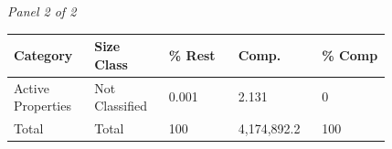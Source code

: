 \documentclass[12pt]{article}
\begin{document}
\begin{landscape}
\begin{table}[H]
\vspace{0.6em}

\textit{Panel 2 of 2}\\[2pt]
{\fontsize{12}{14}\selectfont
\setlength{\tabcolsep}{3pt}
\renewcommand{\arraystretch}{1.08}
\begin{tabular}{p{0.164\linewidth}p{0.164\linewidth}p{0.164\linewidth}p{0.164\linewidth}p{0.164\linewidth}}
\toprule
Category & Size Class & \% Rest & Comp. & \% Comp \\
\midrule
Active Properties & Not Classified & 0.001 & 2.131 & 0 \\
Total & Total & 100 & 4,174,892.2 & 100 \\
\bottomrule
\end{tabular}
}
\end{table}
\end{landscape}
\end{document}
